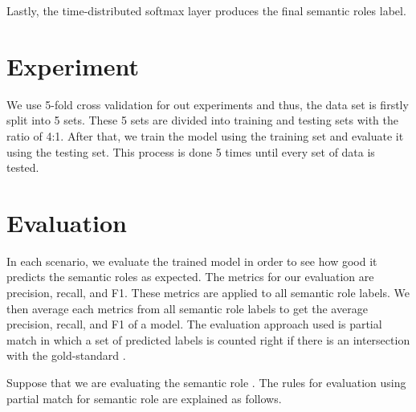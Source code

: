Lastly, the time-distributed softmax layer produces the final semantic roles label.

\section{Experiment}
We use 5-fold cross validation for out experiments and thus, the data set is firstly split into 5 sets. These 5 sets are divided into training and testing sets with the ratio of 4:1. After that, we train the model using the training set and evaluate it using the testing set. This process is done 5 times until every set of data is tested.

\section{Evaluation}
In each scenario, we evaluate the trained model in order to see how good it predicts the semantic roles as expected. The metrics for our evaluation are precision, recall, and F1. These metrics are applied to all semantic role labels. We then average each metrics from all semantic role labels to get the average precision, recall, and F1 of a model. The evaluation approach used is partial match in which a set of predicted labels is counted right if there is an intersection with the gold-standard \citep{seki2003probabilistic}. 

Suppose that we are evaluating the semantic role \patient. The rules for evaluation using partial match for semantic role \patient are explained as follows.

